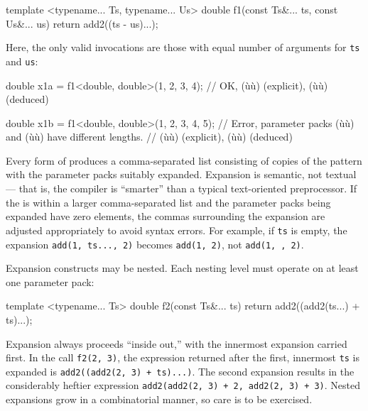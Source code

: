 \begin{emcppslisting}
template <typename... Ts, typename... Us>
double f1(const Ts&... ts, const Us&... us)
{
    return add2((ts - us)...);
}
\end{emcppslisting}
    

\noindent Here, the only valid invocations are those with equal number of
arguments for \lstinline!ts! and \lstinline!us!:

\begin{emcppslisting}
double x1a = f1<double, double>(1, 2, 3, 4);
    // OK, (ù{}ù) (explicit), (ù{}ù) (deduced)

double x1b = f1<double, double>(1, 2, 3, 4, 5);
    // Error, parameter packs (ù{}ù) and (ù{}ù) have different lengths.
    // (ù{}ù) (explicit), (ù{}ù) (deduced)
\end{emcppslisting}
    

\noindent Every form of  produces a comma-separated list
consisting of copies of the pattern with the parameter packs suitably
expanded. Expansion is semantic, not textual --- that is, the compiler
is ``smarter'' than a typical text-oriented preprocessor. If the
 is within a larger comma-separated list and the
parameter packs being expanded have zero elements, the commas
surrounding the expansion are adjusted appropriately to avoid syntax
errors. For example, if \lstinline!ts! is empty, the expansion
\lstinline!add(1,!~\lstinline!ts...,!~\lstinline!2)! becomes
\lstinline!add(1,!~\lstinline!2)!, not \lstinline!add(1,!~\lstinline!,!~\lstinline!2)!.

Expansion constructs may be nested. Each nesting level must operate on
at least one parameter pack:

\begin{emcppslisting}
template <typename... Ts>
double f2(const Ts&... ts)
{
    return add2((add2(ts...) + ts)...);
}
\end{emcppslisting}
    

\noindent Expansion always proceeds ``inside out,'' with the innermost expansion
carried first. In the call \lstinline!f2(2,!~\lstinline!3)!, the expression
returned after the first, innermost \lstinline!ts! is expanded is
\lstinline!add2((add2(2,!~\lstinline!3)!~\lstinline!+!~\lstinline!ts)...)!. The
second expansion results in the considerably heftier expression
\lstinline!add2(add2(2,!~\lstinline!3)!~\lstinline!+!~\lstinline!2,!~\lstinline!add2(2,!~\lstinline!3)!~\lstinline!+!~\lstinline!3)!.
Nested expansions grow in a combinatorial manner, so care is to be
exercised.

